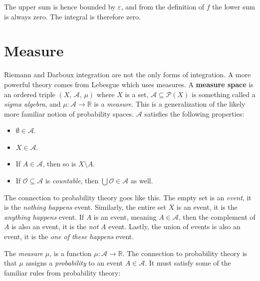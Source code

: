 \documentclass{article}
\theoremstyle{normal}
\begin{document}
            The upper sum is hence bounded by $\varepsilon$, and from the
            definition of $f$ the lower sum is always zero. The integral is
            therefore zero.
            \color{black}
        \fi
    \section{Measure}
        Riemann and Darboux integration are not the only forms of integration.
        A more powerful theory comes from Lebesgue which uses measures.
        A \textbf{measure space} is an ordered triple $(X,\,\mathcal{A},\,\mu)$
        where $X$ is a set, $\mathcal{A}\subseteq\mathcal{P}(X)$
        is something called a \textit{sigma algebra}, and
        $\mu:\mathcal{A}\rightarrow\mathbb{R}$ is a \textit{measure}. This is a
        generalization of the likely more familiar notion of probability spaces.
        $\mathcal{A}$ satisfies the following properties:
        \begin{itemize}
            \item
                $\emptyset\in\mathcal{A}$.
            \item
                $X\in\mathcal{A}$.
            \item
                If $A\in\mathcal{A}$, then so is $X\setminus{A}$.
            \item
                If $\mathcal{O}\subseteq\mathcal{A}$ is \textit{countable},
                then $\bigcup\mathcal{O}\in\mathcal{A}$ as well.
        \end{itemize}
        The connection to probability theory goes like this. The empty set is
        an \textit{event}, it is the \textit{nothing happens} event.
        Similarly, the entire set $X$ is an event, it is the
        \textit{anything happens} event. If $A$ is an event, meaning
        $A\in\mathcal{A}$, then the complement of $A$ is also an event, it
        is the \textit{not} $A$ event. Lastly, the union of events is also an
        event, it is the \textit{one of these happens} event.
        \par\hfill\par
        The \textit{measure} $\mu$, is a function
        $\mu:\mathcal{A}\rightarrow\mathbb{R}$. The connection to probability
        theory is that $\mu$ assigns a \textit{probability} to an event
        $A\in\mathcal{A}$. It must satisfy some of the familiar rules from
        probability theory:
\end{document}
